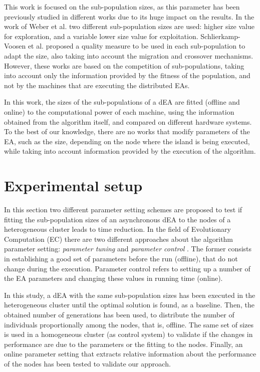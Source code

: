 \documentclass[final,1p,times]{elsarticle}
\begin{document}
This work is focused on the sub-population sizes, as this parameter has been previously studied in different works due to its huge impact on the results. In the work of Weber et al. \cite{DifferentialWeber09} two different sub-population sizes are used: higher size value for exploration, and a variable lower size value for exploitation. Schlierkamp-Voosen et al. \cite{AdaptationSizesSchlierkamp96} proposed a quality measure to be used in each sub-population to adapt the size, also taking into account the migration and crossover mechanisms. However, these works are based on the competition of sub-populations, taking into account only the information provided by the fitness of the population, and not by the machines that are executing the distributed EAs.


In this work, the sizes of the sub-populations of a dEA are fitted (offline and online) to the computational power of each machine, using the information obtained from the algorithm itself, and compared on different hardware systems.
 To the best of our knowledge, there are no works that
 modify parameters of the EA, such as the size, depending on the
 node where the island is being executed, while taking into account information provided by the execution of the algorithm. 


 


\section{Experimental setup}
\label{sec:experiments}
In this section two different parameter setting schemes are proposed to test if fitting the sub-population sizes of an asynchronous dEA to the nodes of a  heterogeneous cluster leads to time reduction. In the field of  Evolutionary Computation (EC) there are two different approaches about the algorithm parameter setting: {\em parameter tuning} and {\em parameter control} \cite{PARAMETERTUNING}. The former consists in establishing a good set of parameters before the run (offline), that do not change  during the execution. Parameter control refers to setting up a number of  the EA parameters  and changing these values in running time (online). 

In this study, a dEA with the same sub-population sizes  has been executed in the heterogeneous cluster until the optimal solution is found, as a baseline. Then, the obtained number of generations has been used, to  distribute the number of individuals proportionally among the nodes, that is, offline. The same set of sizes is used in a homogeneous cluster (as control system) to validate if the changes in performance are due to the parameters or the fitting to the nodes. Finally, an online parameter setting that extracts relative information about the performance of the nodes has been tested to validate our approach. 
\end{document}
